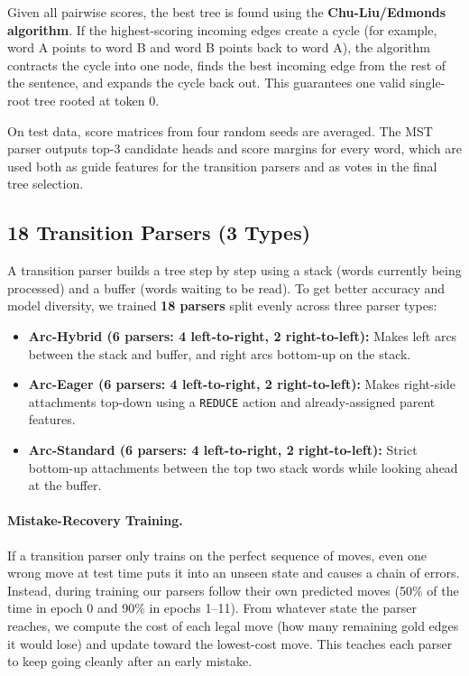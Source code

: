 \documentclass[11pt,a4paper]{article}
\begin{document}
Given all pairwise scores, the best tree is found using the \textbf{Chu-Liu/Edmonds algorithm}. If the highest-scoring incoming edges create a cycle (for example, word A points to word B and word B points back to word A), the algorithm contracts the cycle into one node, finds the best incoming edge from the rest of the sentence, and expands the cycle back out. This guarantees one valid single-root tree rooted at token 0.

On test data, score matrices from four random seeds are averaged. The MST parser outputs top-3 candidate heads and score margins for every word, which are used both as guide features for the transition parsers and as votes in the final tree selection.

\subsection{18 Transition Parsers (3 Types)}
A transition parser builds a tree step by step using a stack (words currently being processed) and a buffer (words waiting to be read). To get better accuracy and model diversity, we trained \textbf{18 parsers} split evenly across three parser types:
\begin{itemize}[noitemsep]
    \item \textbf{Arc-Hybrid (6 parsers: 4 left-to-right, 2 right-to-left):} Makes left arcs between the stack and buffer, and right arcs bottom-up on the stack.
    \item \textbf{Arc-Eager (6 parsers: 4 left-to-right, 2 right-to-left):} Makes right-side attachments top-down using a \texttt{REDUCE} action and already-assigned parent features.
    \item \textbf{Arc-Standard (6 parsers: 4 left-to-right, 2 right-to-left):} Strict bottom-up attachments between the top two stack words while looking ahead at the buffer.
\end{itemize}

\paragraph{Mistake-Recovery Training.}
If a transition parser only trains on the perfect sequence of moves, even one wrong move at test time puts it into an unseen state and causes a chain of errors. Instead, during training our parsers follow their own predicted moves (50\% of the time in epoch 0 and 90\% in epochs 1--11). From whatever state the parser reaches, we compute the cost of each legal move (how many remaining gold edges it would lose) and update toward the lowest-cost move. This teaches each parser to keep going cleanly after an early mistake.
\end{document}
